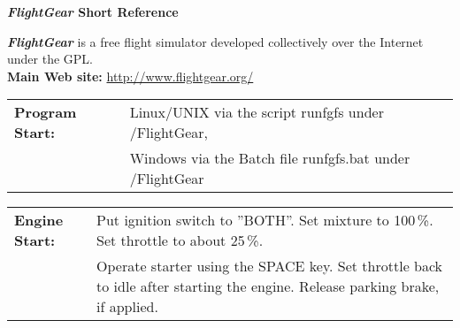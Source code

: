 \documentclass[10pt]{article}
\newcommand{\FlightGear}{{\itshape\bfseries FlightGear}}
\newcommand{\web}[1]{\href{#1}{#1}}
\newcommand{\longpage}{\enlargethispage{\baselineskip}}
\begin{document}
\longpage

\centerline{\large \textbf{\FlightGear{} Short Reference}}
\medskip

\scriptsize \noindent
 \FlightGear{} is a free flight simulator developed collectively over the
 Internet under the GPL.\\

 \noindent
 \textbf{Main Web site:} \web{http://www.flightgear.org/}
 \medskip

 \hspace*{-8mm}
\begin{tabular}{ll}
\textbf{Program Start:}  & Linux/UNIX via the script runfgfs under /FlightGear,\\
                         & Windows via the Batch file runfgfs.bat under /FlightGear
\end{tabular}
 \medskip

\hspace*{-8mm}
\begin{tabular}{ll}
\textbf{Engine Start:}  & Put ignition switch to ''BOTH''. Set mixture to 100\,\%. Set throttle to about 25\,\%.\\
                        & Operate starter using the SPACE key. Set throttle back to idle after starting the engine. Release parking brake, if applied.
\end{tabular}
\medskip
\end{document}
